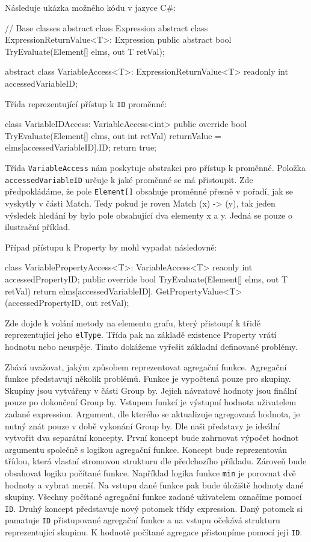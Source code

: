 Následuje ukázka možného kódu v jazyce C\#:
\begin{code}
// Base classes
abstract class Expression { }
abstract class ExpressionReturnValue<T>: Expression {
  public abstract bool TryEvaluate(Element[] elms, out T retVal); 
}

abstract class VariableAccess<T>: ExpressionReturnValue<T> {
     readonly int accessedVariableID; 
}
\end{code}
\clearpage 
Třída reprezentující přístup k \verb+ID+ proměnné:
\begin{code}
class VariableIDAccess: VariableAccess<int> {
  public override bool TryEvaluate(Element[] elms, out int retVal) {
     returnValue = elms[accessedVariableID].ID;
     return true; 
  }
}
\end{code}
Třída \verb+VariableAccess+ nám poskytuje abstrakci pro přístup k proměnné.
Položka \verb+accessedVariableID+ určuje k jaké proměnné se má přistoupit.
Zde předpokládáme, že pole \verb+Element[]+ obsahuje proměnné přesně v pořadí, jak se vyskytly v části Match.
Tedy pokud je roven Match (x) -> (y), tak jeden výsledek hledání by bylo pole obsahující dva elementy x a y.
Jedná se pouze o ilustrační příklad. 

Případ přístupu k Property by mohl vypadat následovně:
\begin{code}
class VariablePropertyAccess<T>: VariableAccess<T> {
  reaonly int accessedPropertyID; 
  public override bool TryEvaluate(Element[] elms, out T retVal) {
    return elms[accessedVariableID].
               GetPropertyValue<T>(accessedPropertyID, out retVal);
  }
}
\end{code}
Zde dojde k volání metody na elementu grafu, který přistoupí k třidě reprezentující jeho \verb+elType+.
Třída pak na základě existence Property vrátí hodnotu nebo neuspěje.
Timto dokážeme vyřešit základní definované problémy.

Zbává uvažovat, jakým způsobem reprezentovat agregační funkce.
Agregační funkce představují několik problémů.
Funkce je vypočtená pouze pro skupiny. 
Skupiny jsou vytvářeny v části Group by.
Jejich návratové hodnoty jsou finální pouze po dokončení Group by. 
Vstupem funkcí je výstupní hodnota uživatelem zadané expression.
Argument, dle kterého se aktualizuje agregovaná hodnota, je nutný znát pouze v době vykonání Group by.
Dle naši představy je ideální vytvořit dva separátní koncepty.
První koncept bude zahrnovat výpočet hodnot argumentu společně s logikou agregační funkce.
Koncept bude reprezentován třídou, která vlastní stromovou strukturu dle předchozího příkladu.
Zároveň bude obsahovat logiku počítané funkce.
Například logika funkce \verb+min+ je porovnat dvě hodnoty a vybrat menší.
Na vstupu dané funkce pak bude úložiště hodnoty dané skupiny.
Všechny počítané agregační funkce zadané uživatelem označíme pomocí \verb+ID+.
Druhý koncept představuje nový potomek třídy expression.
Daný potomek si pamatuje \verb+ID+ přistupované agregační funkce a na vstupu očekává strukturu reprezentující skupinu.
K hodnotě počítané agregace přistoupíme pomocí její \verb+ID+.

